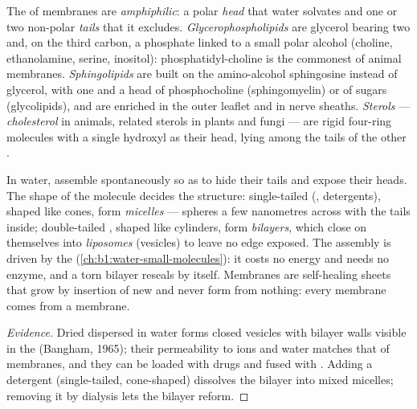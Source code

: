 \begin{definition}\label{def:b1:lipids:amphiphilic}
The  of membranes are \emph{amphiphilic}: a polar \emph{head} that water solvates and one or two
non-polar \emph{tails} that it excludes.
\emph{Glycerophospholipids} are glycerol bearing two
 and, on the third carbon, a phosphate linked to a small
polar alcohol (choline, ethanolamine, serine, inositol): phosphatidyl-choline
is the commonest  of animal membranes. \emph{Sphingolipids}
are built on the amino-alcohol sphingosine instead of glycerol, with
one  and a head of phosphocholine (sphingomyelin) or of
sugars (glycolipids), and are enriched in the outer leaflet and in
nerve sheaths. \emph{Sterols} --- \emph{cholesterol}
in animals, related sterols in plants and fungi --- are rigid four-ring
molecules with a single hydroxyl as their head, lying among the tails
of the other .
\end{definition}

\begin{proposition}\label{prop:b1:lipids:selfassembly}
In water,  assemble spontaneously so as to hide
their tails and expose their heads. The shape of the molecule decides
the structure: single-tailed  (, detergents), shaped
like cones, form \emph{micelles} --- spheres a few nanometres across
with the tails inside; double-tailed , shaped like
cylinders, form \emph{bilayers}, which close on themselves into
\emph{liposomes} (vesicles) to leave no edge exposed. The assembly is
driven by the  (\cref{ch:b1:water-small-molecules}):
it costs no energy and needs no enzyme, and a torn bilayer reseals by
itself. Membranes are self-healing sheets that grow by insertion of new
 and never form from nothing: every membrane comes from a
membrane.
\end{proposition}
\begin{proof}[Evidence]
Dried  dispersed in water forms closed vesicles with
bilayer walls visible in the  (Bangham, 1965);
their permeability to ions and water matches that of  membranes,
and they can be loaded with drugs and fused with . Adding a
detergent (single-tailed, cone-shaped) dissolves the bilayer into
mixed micelles; removing it by dialysis lets the bilayer reform.
\end{proof}

